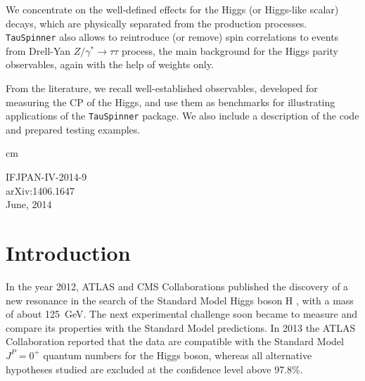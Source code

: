 \documentclass[12pt]{article}
\begin{document}
\begin{titlepage}
We concentrate on the well-defined  
effects for the Higgs (or Higgs-like scalar) decays, which are physically separated from the
production processes. 
{\tt TauSpinner}  also
allows to reintroduce (or remove) spin correlations  to events from Drell-Yan 
$Z/\gamma^* \to \tau \tau$ process, the main background for the Higgs parity 
observables, again with the help of weights only. 

From the literature, we recall well-established observables, developed for 
measuring the CP of the Higgs,
 and use them as benchmarks for illustrating applications 
of the {\tt TauSpinner} package.  
We also include a description of the code and prepared testing examples. 








 cm



\vspace{0.2 cm}
 
 \vspace{1cm}
\begin{flushleft}
{   IFJPAN-IV-2014-9\\ 	arXiv:1406.1647 \\
 June, 2014}
\end{flushleft}
 
\vspace*{1mm}
\bigskip
\noindent
{\footnotesize \noindent%
}
\end{titlepage}



\section{Introduction}

In the year 2012, ATLAS and CMS Collaborations published the discovery of a new resonance 
\cite{AtlasHiggs2012, CMSHiggs2012} in the search of the Standard Model Higgs boson H \cite{Englert64, Higgs64}, 
with a mass of about 125~GeV. The next experimental challenge soon became to measure and compare
its properties with the Standard Model predictions. In 2013 the ATLAS Collaboration reported 
\cite{AtlasScalar2013} that the data are compatible with the Standard Model $J^{P} = 0^{+}$ 
quantum numbers for the Higgs boson, whereas all alternative hypotheses studied 
are excluded at the confidence level above 97.8\%. 
\end{document}
